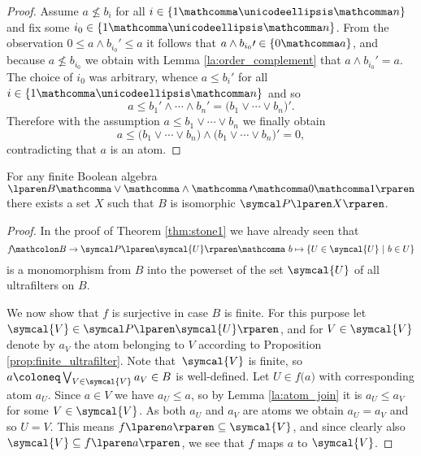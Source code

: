 \begin{proof}
  Assume $a \nleq b_i$
  for all
  $i \in \lbrace 1 \mathcomma \unicodeellipsis \mathcomma n \rbrace$
  and fix some
  $i_0 \in \lbrace 1 \mathcomma \unicodeellipsis \mathcomma n \rbrace$.
  From the observation $0 \leq a \wedge b_{ i_0 } \prime \leq a$
  it follows that
  $a \wedge b_{ i_0 } \prime \in \lbrace 0 \mathcomma a \rbrace$,
  and because $a \nleq b_{ i_0 }$
  we obtain with Lemma \ref{la:order_complement}
  that $a \wedge b_{ i_0 } \prime \equal a$.
  The choice of $i_0$ was arbitrary,
  whence $a \leq b_i \prime$
  for
  all~$i \in \lbrace 1 \mathcomma \unicodeellipsis \mathcomma n \rbrace$
  and so
  \[
    a
    \leq
    b_1 \prime \wedge \cdots \wedge b_n \prime
    \equal
    \lparen b_1 \vee \cdots \vee b_n \rparen \prime.
  \]
  Therefore with the assumption $a \leq b_1 \vee \cdots \vee b_n$
  we finally obtain
  \[
    a
    \leq
    \lparen b_1 \vee \cdots \vee b_n \rparen
      \wedge \lparen b_1 \vee \cdots \vee b_n \rparen \prime
    \equal
    0,
  \]
  contradicting that $a$ is an atom.
\end{proof}

\begin{theorem}
  For any finite Boolean algebra
  $\lparen B \mathcomma \vee \mathcomma \wedge \mathcomma \, \prime
  \mathcomma 0 \mathcomma 1 \rparen$
  there exists a set $X$ such that $B$ is isomorphic $\Po{X}$.
\end{theorem}

\begin{proof}
  In the proof of Theorem \ref{thm:stone1} we have already seen that
  \[
    f
    \! \mathcolon
    B
    \rightarrow
    \Po{ \symcal{U} }
    \mathcomma \
    b
    \mapsto
    \lbrace
    U \in \symcal{U}
    \pipe
    b \in U
    \rbrace
  \]
  is a monomorphism from $B$
  into the powerset of the set $\symcal{U}$ of all ultrafilters on $B$.

  We now show that $f$ is surjective in case $B$ is finite.
  For this purpose let $\symcal{V} \in \Po{ \symcal{U} }$,
  and for $V \in \symcal{V}$ denote by $a_V$ the atom belonging to $V$
  according to Proposition \ref{prop:finite_ultrafilter}.
  Note that~$\symcal{V}$ is finite,
  so $a \coloneq \bigvee_{ V \in \symcal{V} } a_V \in B$ is well-defined.
  Let $U \in f \lparen a \rparen$ with corresponding atom $a_U$.
  Since $a \in V$ we have $a_U \leq a$,
  so by Lemma \ref{la:atom_join} it is $a_U \leq a_V$
  for some $V \in \symcal{V}$.
  As both $a_U$ and $a_V$ are atoms we obtain $a_U \equal a_V$
  and so $U \equal V$.
  This means $f \lparen a \rparen \subseteq \symcal{V}$,
  and since clearly also $\symcal{V} \subseteq f \lparen a \rparen$,
  we see that $f$ maps $a$ to $\symcal{V}$.
\end{proof}
